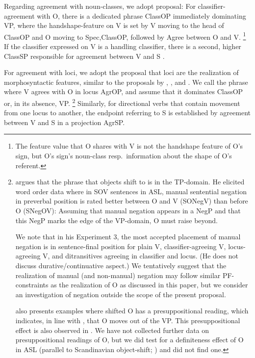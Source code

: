 \documentclass[output=paper]{langscibook}
\begin{document}
\begin{sloppypar}
Regarding agreement with noun-classes, we adopt 
proposal: For classifier-agreement with O, there is
a dedicated phrase ClassOP immediately dominating VP, where the
handshape-feature on V is set by V moving to the head of ClassOP and O
moving to Spec,ClassOP, followed by Agree between O and V.%
\footnote{%
    The feature value that O shares with V is not the handshape feature of O’s
    sign, but O’s sign’s noun-class resp.~information about the shape of O’s referent.
}
If the
classifier expressed on V is a handling classifier, there is a second,
higher ClassSP responsible for agreement between V and S \citep{Benedicto.Brentari.2004}.
\end{sloppypar}

For agreement with loci, we adopt the proposal that loci are the
realization of morphosyntactic features, similar to the proposals by
\citet{Neidle.etal.2000}, \citet{Kuhn.2016}, and \citet{Pfau.etal.2018}. We call the
phrase where V agrees with O in locus AgrOP, and assume that it
dominates ClassOP or, in its absence, VP.%
\footnote{%
    \citet{Gokgoz.2013} argues that the phrase that objects shift to is in the
    TP-domain. He elicited word order data where in SOV sentences in ASL, manual
    sentential negation in preverbal position is rated better between O and V (SONegV)
    than before O (SNegOV): Assuming that manual negation appears in a NegP and
    that this NegP marks the edge of the VP-domain, O must raise beyond.
    
    We note that in his Experiment 3, the most accepted placement of manual
    negation is in sentence-final position for plain V, classifier-agreeing V,
    locus-agreeing V, and ditransitives agreeing in classifier and locus. (He does not
    discuss durative/continuative aspect.) We tentatively suggest that the realization of
    manual (and non-manual) negation may follow similar PF-constraints as the
    realization of O as discussed in this paper, but we consider an investigation of
    negation outside the scope of the present proposal.
    
    \citeauthor{Gokgoz.2013} also presents examples where shifted O has a presuppositional
    reading, which indicates, in line with \citet{Diesing1992}, that O moves out of the VP.
    This presuppositional effect is also observed in \citet{Napoli.SS.RMQ.2017}. We have not
    collected further data on presuppositional readings of O, but we did test for a
    definiteness effect of O in ASL (parallel to Scandinavian object-shift; \citealp{Holmberg:1986})
    and did not find one.
}
Similarly, for
directional verbs that contain movement from one locus to another, the
endpoint referring to S is established by agreement between V and S
in a projection AgrSP.
\end{document}
